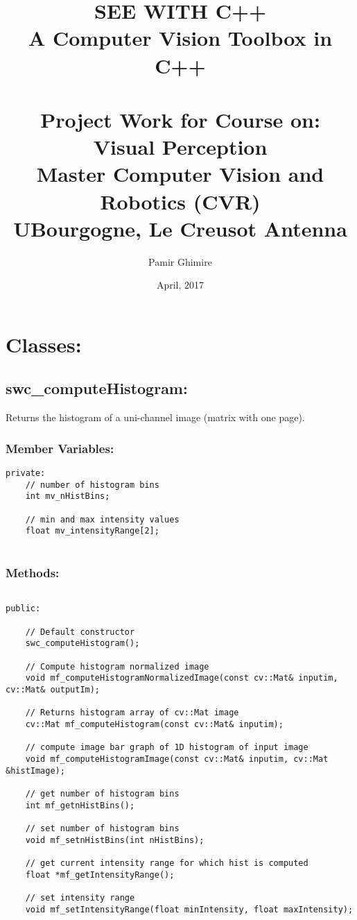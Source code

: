 \documentclass{article}
\title{SEE WITH C++ \\ A Computer Vision Toolbox in C++ \\ ~ \\ Project Work for Course on: \\ Visual Perception \\ Master Computer Vision and Robotics (CVR) \\ UBourgogne, Le Creusot Antenna}
\author{Pamir Ghimire}
\date{April, 2017}
\begin{document}
\maketitle
\pagebreak

\section{Classes:}
\subsection{swc\_computeHistogram:}
Returns the histogram of a uni-channel image (matrix with one page).

\subsubsection{Member Variables:}
\begin{lstlisting}
private:
    // number of histogram bins
    int mv_nHistBins;

    // min and max intensity values
    float mv_intensityRange[2];
    
\end{lstlisting}

\subsubsection{Methods:}
\begin{lstlisting}

public:

	// Default constructor
    swc_computeHistogram();

    // Compute histogram normalized image
    void mf_computeHistogramNormalizedImage(const cv::Mat& inputim, cv::Mat& outputIm);

    // Returns histogram array of cv::Mat image
    cv::Mat mf_computeHistogram(const cv::Mat& inputim);

    // compute image bar graph of 1D histogram of input image
    void mf_computeHistogramImage(const cv::Mat& inputim, cv::Mat &histImage);

    // get number of histogram bins
    int mf_getnHistBins();

    // set number of histogram bins
    void mf_setnHistBins(int nHistBins);

    // get current intensity range for which hist is computed
    float *mf_getIntensityRange();

    // set intensity range
    void mf_setIntensityRange(float minIntensity, float maxIntensity);

\end{lstlisting}
\end{document}
